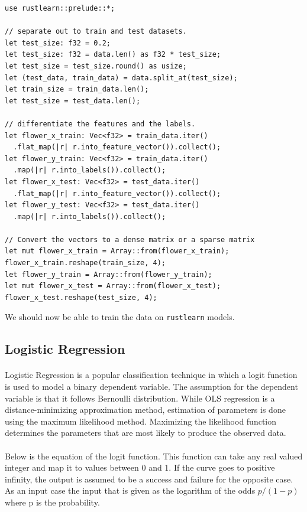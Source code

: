 \documentclass{book}
\begin{document}
\begin{lstlisting}[caption={chapter3\\/rustlearn\_classification\_tasks\\/src\\/logistic\_reg\\.rs}]
use rustlearn::prelude::*;

// separate out to train and test datasets.
let test_size: f32 = 0.2;
let test_size: f32 = data.len() as f32 * test_size;
let test_size = test_size.round() as usize;
let (test_data, train_data) = data.split_at(test_size);
let train_size = train_data.len();
let test_size = test_data.len();

// differentiate the features and the labels.
let flower_x_train: Vec<f32> = train_data.iter()
  .flat_map(|r| r.into_feature_vector()).collect();
let flower_y_train: Vec<f32> = train_data.iter()
  .map(|r| r.into_labels()).collect();
let flower_x_test: Vec<f32> = test_data.iter()
  .flat_map(|r| r.into_feature_vector()).collect();
let flower_y_test: Vec<f32> = test_data.iter()
  .map(|r| r.into_labels()).collect();

// Convert the vectors to a dense matrix or a sparse matrix
let mut flower_x_train = Array::from(flower_x_train);
flower_x_train.reshape(train_size, 4);
let flower_y_train = Array::from(flower_y_train);
let mut flower_x_test = Array::from(flower_x_test);
flower_x_test.reshape(test_size, 4);
\end{lstlisting}

We should now be able to train the data on \lstinline{rustlearn} models.
\label{sub:iris_data_set}

\subsection{Logistic Regression}%
\paragraph{}%
Logistic Regression is a popular classification technique in which a logit function is used to model a binary dependent variable. The assumption for the dependent variable is that it follows Bernoulli distribution. While OLS regression is a distance-minimizing approximation method, estimation of parameters is done using the maximum likelihood method. Maximizing the likelihood function determines the parameters that are most likely to produce the observed data.
\label{par:}
\paragraph{}%
Below is the equation of the logit function. This function can take any real valued integer and map it to values between 0 and 1. If the curve goes to positive infinity, the output is assumed to be a success and failure for the opposite case. As an input case the input that is given as the logarithm of the odds $p/(1-p)$ where p is the probability.
\end{document}

